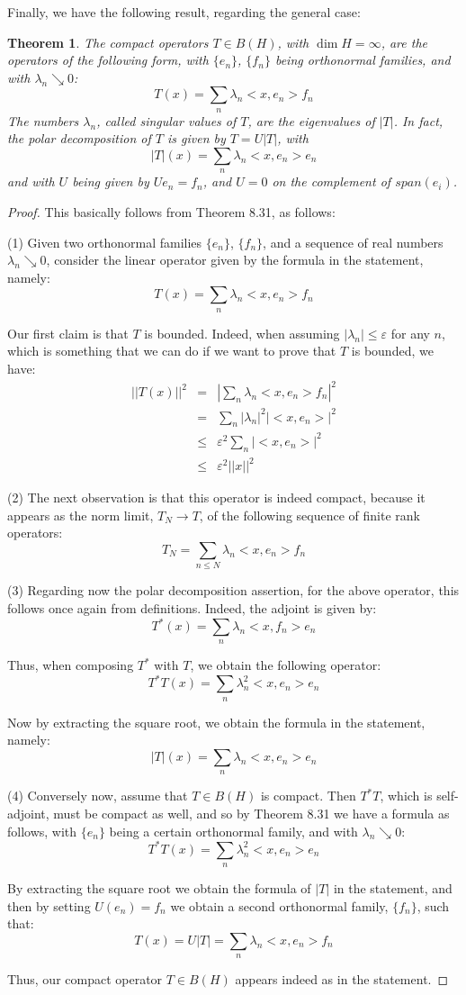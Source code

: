 \documentclass[12pt]{amsbook}
\newtheorem{theorem}{Theorem}[chapter]
\begin{document}
Finally, we have the following result, regarding the general case:

\begin{theorem}
The compact operators $T\in B(H)$, with $\dim H=\infty$, are the operators of the following form, with $\{e_n\}$, $\{f_n\}$ being orthonormal families, and with $\lambda_n\searrow0$:
$$T(x)=\sum_n\lambda_n<x,e_n>f_n$$
The numbers $\lambda_n$, called singular values of $T$, are the eigenvalues of $|T|$. In fact, the polar decomposition of $T$ is given by $T=U|T|$, with
$$|T|(x)=\sum_n\lambda_n<x,e_n>e_n$$
and with $U$ being given by $Ue_n=f_n$, and $U=0$ on the complement of $span(e_i)$.
\end{theorem}

\begin{proof}
This basically follows from Theorem 8.31, as follows:

\medskip

(1) Given two orthonormal families $\{e_n\}$, $\{f_n\}$, and a sequence of real numbers $\lambda_n\searrow0$, consider the linear operator given by the formula in the statement, namely:
$$T(x)=\sum_n\lambda_n<x,e_n>f_n$$

Our first claim is that $T$ is bounded. Indeed, when assuming $|\lambda_n|\leq\varepsilon$ for any $n$, which is something that we can do if we want to prove that $T$ is bounded, we have:
\begin{eqnarray*}
||T(x)||^2
&=&\left|\sum_n\lambda_n<x,e_n>f_n\right|^2\\
&=&\sum_n|\lambda_n|^2|<x,e_n>|^2\\
&\leq&\varepsilon^2\sum_n|<x,e_n>|^2\\
&\leq&\varepsilon^2||x||^2
\end{eqnarray*}

(2) The next observation is that this operator is indeed compact, because it appears as the norm limit, $T_N\to T$, of the following sequence of finite rank operators:
$$T_N=\sum_{n\leq N}\lambda_n<x,e_n>f_n$$

(3) Regarding now the polar decomposition assertion, for the above operator, this follows once again from definitions. Indeed, the adjoint is given by:
$$T^*(x)=\sum_n\lambda_n<x,f_n>e_n$$

Thus, when composing $T^*$ with $T$, we obtain the following operator:
$$T^*T(x)=\sum_n\lambda_n^2<x,e_n>e_n$$

Now by extracting the square root, we obtain the formula in the statement, namely:
$$|T|(x)=\sum_n\lambda_n<x,e_n>e_n$$

(4) Conversely now, assume that $T\in B(H)$ is compact. Then $T^*T$, which is self-adjoint, must be compact as well, and so by Theorem 8.31 we have a formula as follows, with $\{e_n\}$ being a certain orthonormal family, and with $\lambda_n\searrow0$:
$$T^*T(x)=\sum_n\lambda_n^2<x,e_n>e_n$$

By extracting the square root we obtain the formula of $|T|$ in the statement, and then by setting $U(e_n)=f_n$ we obtain a second orthonormal family, $\{f_n\}$, such that:
$$T(x)
=U|T|
=\sum_n\lambda_n<x,e_n>f_n$$

Thus, our compact operator $T\in B(H)$ appears indeed as in the statement.
\end{proof}
\end{document}
